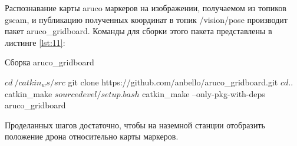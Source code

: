 Распознавание карты aruco маркеров на изображении, получаемом из топиков gscam, и публикацию полученных координат в топик /vision/pose производит пакет aruco\_gridboard. Команды для сборки этого пакета представлены в листинге \ref{lst:11}:
\begin{Program}[H]
	\caption{Сборка aruco\_gridboard} \label{lst:11}
	\begin{MyCode}	
	$ cd ~/catkin_ws/src
	$ git clone https://github.com/anbello/aruco_gridboard.git
	$ cd ..
	$ catkin_make
	$ source devel/setup.bash
	$ catkin_make --only-pkg-with-deps aruco_gridboard
	\end{MyCode}
\end{Program}

Проделанных шагов достаточно, чтобы на наземной станции отобразить положение дрона относительно карты маркеров.
